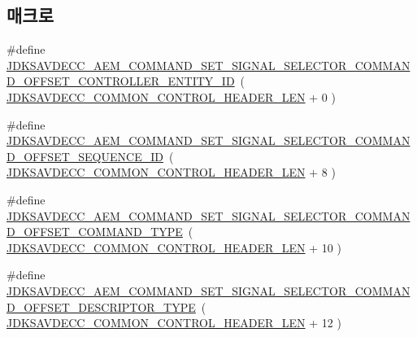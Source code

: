 \subsection*{매크로}
\begin{DoxyCompactItemize}
\item 
\#define \hyperlink{group__command__set__signal__selector_ga9c3b1cc49585f7264350bfea73bbe3f7}{J\+D\+K\+S\+A\+V\+D\+E\+C\+C\+\_\+\+A\+E\+M\+\_\+\+C\+O\+M\+M\+A\+N\+D\+\_\+\+S\+E\+T\+\_\+\+S\+I\+G\+N\+A\+L\+\_\+\+S\+E\+L\+E\+C\+T\+O\+R\+\_\+\+C\+O\+M\+M\+A\+N\+D\+\_\+\+O\+F\+F\+S\+E\+T\+\_\+\+C\+O\+N\+T\+R\+O\+L\+L\+E\+R\+\_\+\+E\+N\+T\+I\+T\+Y\+\_\+\+ID}~( \hyperlink{group__jdksavdecc__avtp__common__control__header_gaae84052886fb1bb42f3bc5f85b741dff}{J\+D\+K\+S\+A\+V\+D\+E\+C\+C\+\_\+\+C\+O\+M\+M\+O\+N\+\_\+\+C\+O\+N\+T\+R\+O\+L\+\_\+\+H\+E\+A\+D\+E\+R\+\_\+\+L\+EN} + 0 )
\item 
\#define \hyperlink{group__command__set__signal__selector_ga201a4880c05231b24f3a27b868337719}{J\+D\+K\+S\+A\+V\+D\+E\+C\+C\+\_\+\+A\+E\+M\+\_\+\+C\+O\+M\+M\+A\+N\+D\+\_\+\+S\+E\+T\+\_\+\+S\+I\+G\+N\+A\+L\+\_\+\+S\+E\+L\+E\+C\+T\+O\+R\+\_\+\+C\+O\+M\+M\+A\+N\+D\+\_\+\+O\+F\+F\+S\+E\+T\+\_\+\+S\+E\+Q\+U\+E\+N\+C\+E\+\_\+\+ID}~( \hyperlink{group__jdksavdecc__avtp__common__control__header_gaae84052886fb1bb42f3bc5f85b741dff}{J\+D\+K\+S\+A\+V\+D\+E\+C\+C\+\_\+\+C\+O\+M\+M\+O\+N\+\_\+\+C\+O\+N\+T\+R\+O\+L\+\_\+\+H\+E\+A\+D\+E\+R\+\_\+\+L\+EN} + 8 )
\item 
\#define \hyperlink{group__command__set__signal__selector_ga33364977674173db74ff8ab481a3810e}{J\+D\+K\+S\+A\+V\+D\+E\+C\+C\+\_\+\+A\+E\+M\+\_\+\+C\+O\+M\+M\+A\+N\+D\+\_\+\+S\+E\+T\+\_\+\+S\+I\+G\+N\+A\+L\+\_\+\+S\+E\+L\+E\+C\+T\+O\+R\+\_\+\+C\+O\+M\+M\+A\+N\+D\+\_\+\+O\+F\+F\+S\+E\+T\+\_\+\+C\+O\+M\+M\+A\+N\+D\+\_\+\+T\+Y\+PE}~( \hyperlink{group__jdksavdecc__avtp__common__control__header_gaae84052886fb1bb42f3bc5f85b741dff}{J\+D\+K\+S\+A\+V\+D\+E\+C\+C\+\_\+\+C\+O\+M\+M\+O\+N\+\_\+\+C\+O\+N\+T\+R\+O\+L\+\_\+\+H\+E\+A\+D\+E\+R\+\_\+\+L\+EN} + 10 )
\item 
\#define \hyperlink{group__command__set__signal__selector_gaf1c358d17635f50747fe271c5f12a9fe}{J\+D\+K\+S\+A\+V\+D\+E\+C\+C\+\_\+\+A\+E\+M\+\_\+\+C\+O\+M\+M\+A\+N\+D\+\_\+\+S\+E\+T\+\_\+\+S\+I\+G\+N\+A\+L\+\_\+\+S\+E\+L\+E\+C\+T\+O\+R\+\_\+\+C\+O\+M\+M\+A\+N\+D\+\_\+\+O\+F\+F\+S\+E\+T\+\_\+\+D\+E\+S\+C\+R\+I\+P\+T\+O\+R\+\_\+\+T\+Y\+PE}~( \hyperlink{group__jdksavdecc__avtp__common__control__header_gaae84052886fb1bb42f3bc5f85b741dff}{J\+D\+K\+S\+A\+V\+D\+E\+C\+C\+\_\+\+C\+O\+M\+M\+O\+N\+\_\+\+C\+O\+N\+T\+R\+O\+L\+\_\+\+H\+E\+A\+D\+E\+R\+\_\+\+L\+EN} + 12 )

\end{DoxyCompactItemize}
